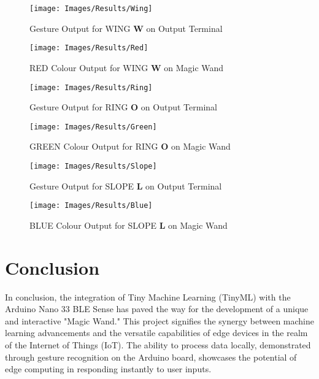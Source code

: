 \begin{figure}[H]
	\centering
	\texttt{[image: Images/Results/Wing]}
	\caption{Gesture Output for WING \textbf{W} on Output Terminal } 
	\label{fig: Result for Wing Gesture}
\end{figure}

\begin{figure}[H]
	\centering
	\texttt{[image: Images/Results/Red]}
	\caption{RED Colour Output for WING \textbf{W} on Magic Wand} 
	\label{fig: Wand Colour for Wing Gesture}
\end{figure}

\begin{figure}[H]
	\centering
	\texttt{[image: Images/Results/Ring]}
	\caption{Gesture Output for RING \textbf{O} on Output Terminal } 
	\label{fig: Result for Ring Gesture}
\end{figure}

\begin{figure}[H]
	\centering
	\texttt{[image: Images/Results/Green]}
	\caption{GREEN Colour Output for RING \textbf{O} on Magic Wand } 
	\label{fig: Wand Colour for Ring Gesture}
\end{figure}

\begin{figure}[H]
	\centering
	\texttt{[image: Images/Results/Slope]}
	\caption{Gesture Output for  SLOPE \textbf{L} on Output Terminal } 
	\label{fig: Result for Slope Gesture}
\end{figure}

\begin{figure}[H]
	\centering
	\texttt{[image: Images/Results/Blue]}
	\caption{BLUE Colour Output for  SLOPE \textbf{L} on Magic Wand } 
	\label{fig: Wand Colour for Slope Gesture}
\end{figure}

\chapter{Conclusion}
\label{Conclusion}

In conclusion, the integration of Tiny Machine Learning (TinyML) with the Arduino Nano 33 BLE Sense has paved the way for the development of a unique and interactive "Magic Wand." This project signifies the synergy between machine learning advancements and the versatile capabilities of edge devices in the realm of the Internet of Things (IoT). The ability to process data locally, demonstrated through gesture recognition on the Arduino board, showcases the potential of edge computing in responding instantly to user inputs.

